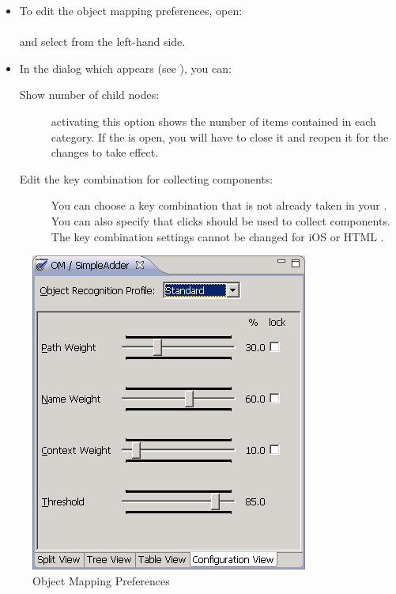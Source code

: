 \label{objectprefs}

\begin{itemize}
\item To edit the object mapping preferences, open:\\
\\
and select  from the left-hand side.
\item In the dialog which appears (see ), you can:
\begin{description}
\item[Show number of child nodes:]{activating this option shows the number of items contained in each category. If the \gdomeditor{} is open, you will have to close it and reopen it for the changes to take effect.}
\item [Edit the key combination for collecting components:]{You can choose a key combination that is not already taken in your \gdaut{}. You can also specify that clicks should be used to collect components. The key combination settings cannot be changed for iOS or HTML \gdauts{}.}
\end{description}
\end{itemize}

\begin{figure} [htbp]
\begin{center}
\includegraphics{Tasks/Objectmapping/PS/objectmappingpref} 
\caption{Object Mapping Preferences}
\label{objectmappingpref}
\end{center}
\end{figure}
